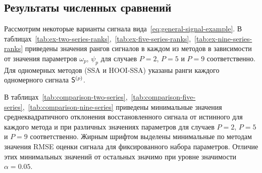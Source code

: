 \documentclass[specialist,
    substylefile = spbu.rtx,
    subf,href,colorlinks=true, 12pt]{disser}
\theoremstyle{plain}
\theoremstyle{definition}
\newtheorem{example}{Пример}[section]
\theoremstyle{remark}
\begin{document}

    \subsection{Результаты численных сравнений}\label{subsec:numerical-comp-signal}
    Рассмотрим некоторые варианты сигнала вида~\eqref{eq:general-signal-example}.
    В таблицах~\ref{tab:ex-two-series-ranks},~\ref{tab:ex-five-series-ranks},~\ref{tab:ex-nine-series-ranks}
    приведены значения рангов сигналов в каждом из методов в зависимости от значения параметров $\omega_p$, $\psi_p$
    для случаев $P=2$, $P=5$ и $P=9$
    соответственно.
    Для одномерных методов (SSA и HOOI-SSA) указаны ранги каждого одномерного сигнала $\mathsf{S}^{(p)}$.

    В таблицах~\ref{tab:comparison-two-series},~\ref{tab:comparison-five-series},~\ref{tab:comparison-nine-series}
    приведены минимальные значения среднеквадратичного отклонения
    восстановленного сигнала от истинного для каждого метода и при различных значениях параметров
    для случаев $P=2$, $P=5$ и $P=9$
    соответственно.
    Жирным шрифтом выделены минимальные по методам значения RMSE оценки сигнала
    для фиксированного набора параметров.
    Отличие этих минимальных значений от остальных значимо при уровне значимости $\alpha=0.05$.
\end{document}
